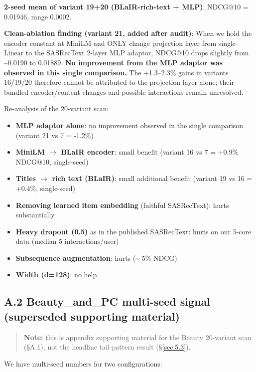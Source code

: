 

\textbf{2-seed mean of variant 19+20 (BLaIR-rich-text + MLP)}: NDCG@10 = 0.01946, range 0.0002.

\textbf{Clean-ablation finding (variant 21, added after audit)}: When we hold the encoder constant at MiniLM and ONLY change projection layer from single-Linear to the SASRecText 2-layer MLP adaptor, NDCG@10 drops slightly from \textasciitilde0.0190 to 0.01889. \textbf{No improvement from the MLP adaptor was observed in this single comparison.} The +1.3--2.3\% gains in variants 16/19/20 therefore cannot be attributed to the projection layer alone; their bundled encoder/content changes and possible interactions remain unresolved.

Re-analysis of the 20-variant scan:

\begin{itemize}
\tightlist
\item
  \textbf{MLP adaptor alone}: no improvement observed in the single comparison (variant 21 vs 7 = -1.2\%)
\item
  \textbf{MiniLM \ensuremath{\rightarrow} BLaIR encoder}: small benefit (variant 16 vs 7 = +0.9\% NDCG@10, single-seed)
\item
  \textbf{Titles \ensuremath{\rightarrow} rich text (BLaIR)}: small additional benefit (variant 19 vs 16 = +0.4\%, single-seed)
\item
  \textbf{Removing learned item embedding} (faithful SASRecText): hurts substantially
\item
  \textbf{Heavy dropout (0.5)} as in the published SASRecText: hurts on our 5-core data (median 5 interactions/user)
\item
  \textbf{Subsequence augmentation}: hurts (\textasciitilde-5\% NDCG)
\item
  \textbf{Width (d=128)}: no help
\end{itemize}


\subsection*{A.2 Beauty\_and\_\allowbreak PC multi-seed signal (superseded supporting material)}

\begin{quote}
\textbf{Note:} this is appendix supporting material for the Beauty 20-variant scan (\S{}A.1), not the headline tail-pattern result (\S\ref{sec:5.3}).
\end{quote}

We have multi-seed numbers for two configurations:


